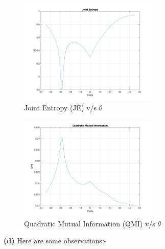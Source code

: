 \documentclass[12pt]{article}
\begin{document}
    \begin{figure}[H]
        \centering
        \includegraphics[width=0.59\textwidth]{Images/Q5/JE.png}
        \vspace{-10pt}
        \caption{Joint Entropy (JE) v/s $\theta$}
    \end{figure}
    
    \vspace{-25pt}
    
    \begin{figure}[H]
        \centering
        \includegraphics[width=0.59\textwidth]{Images/Q5/QMI.png}
        \vspace{-10pt}
        \caption{Quadratic Mutual Information (QMI) v/s $\theta$}
    \end{figure}
    
    \textbf{(d)} Here are some observations:-
    
    \vspace{-10pt}
    
\end{document}
